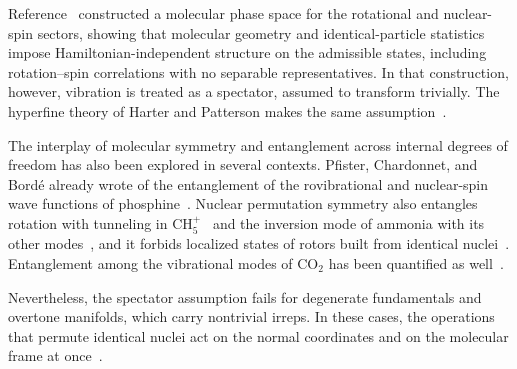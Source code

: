 \documentclass[
  reprint,
  aps,
  prx,
  superscriptaddress,
  amsmath,
  amssymb,
  longbibliography
]{revtex4-2}
\begin{document}
Reference~\cite{albert2025quantumtheorymolecularorientations} constructed a molecular phase space for the rotational and nuclear-spin sectors, showing that molecular geometry and identical-particle statistics impose Hamiltonian-independent structure on the admissible states, including rotation--spin correlations with no separable representatives. In that construction, however, vibration is treated as a spectator, assumed to transform trivially. The hyperfine theory of Harter and Patterson makes the same assumption~\cite{HarterPatterson1979}. 

The interplay of molecular symmetry and entanglement across internal degrees of freedom has also been explored in several contexts. Pfister, Chardonnet, and Bord\'e already wrote of the entanglement of the rovibrational and nuclear-spin wave functions of phosphine~\cite{Pfister1996}. Nuclear permutation symmetry also entangles rotation with tunneling in CH$_5^+$~\cite{Wodraszka2015} and the inversion mode of ammonia with its other modes~\cite{Bouakline2020}, and it forbids localized states of rotors built from identical nuclei~\cite{GrohmannManz2018}. Entanglement among the vibrational modes of CO$_2$ has been quantified as well~\cite{Rauhut2024}.

Nevertheless, the spectator assumption fails for degenerate fundamentals and overtone manifolds, which carry nontrivial irreps. In these cases, the operations that permute identical nuclei act on the normal coordinates and on the molecular frame at once~\cite{LonguetHiggins1963, Hougen1962}. 
\end{document}

